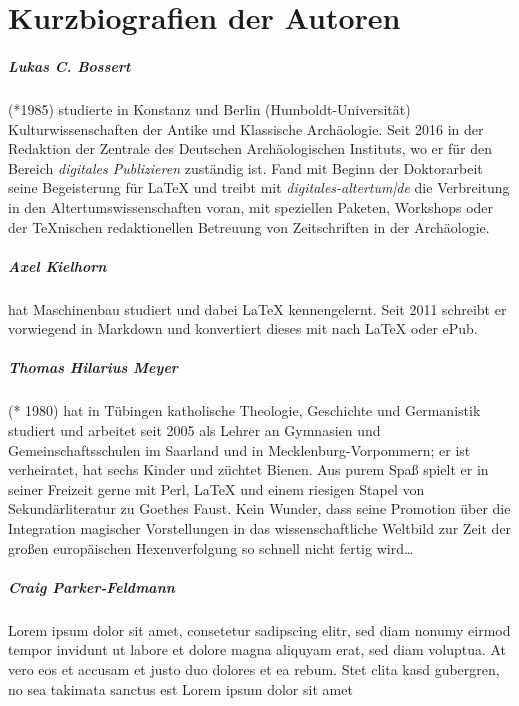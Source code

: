 \chapter{Kurzbiografien der Autoren}


\paragraph{Lukas C. Bossert} (*1985) studierte in Konstanz und Berlin (Humboldt-Universität) Kulturwissenschaften der Antike und Klassische Archäologie. Seit 2016 in der Redaktion der Zentrale des Deutschen Archäologischen Instituts,
wo er für den Bereich \emph{digitales Publizieren} zuständig ist.
Fand mit Beginn der Doktorarbeit seine Begeisterung für \LaTeX{} und treibt mit \emph{digitales-altertum|de} die Verbreitung in den  Altertumswissenschaften voran, mit speziellen Paketen, Workshops oder der \TeX nischen redaktionellen Betreuung von Zeitschriften in der Archäologie.

\paragraph{Axel Kielhorn} hat Maschinenbau studiert und dabei \LaTeX{} kennengelernt. 
Seit 2011 schreibt er vorwiegend in Markdown und konvertiert dieses mit  nach \LaTeX{} oder ePub.

\paragraph{Thomas Hilarius Meyer} (* 1980) hat in Tübingen katholische Theologie, Geschichte und Germanistik studiert und arbeitet
seit 2005 als Lehrer an Gymnasien und Gemeinschaftsschulen im Saarland und in Mecklenburg-Vorpommern;
er ist verheiratet, hat sechs Kinder und züchtet Bienen.
Aus purem Spaß spielt er in seiner Freizeit gerne mit Perl, \LaTeX{} und einem riesigen Stapel von Sekundärliteratur zu
Goethes Faust. Kein Wunder, dass seine Promotion über die Integration magischer Vorstellungen in das wissenschaftliche Weltbild
zur Zeit der großen europäischen Hexenverfolgung so schnell nicht fertig wird\ldots

\paragraph{Craig Parker-Feldmann} Lorem ipsum dolor sit amet, consetetur sadipscing elitr, sed diam nonumy eirmod tempor invidunt ut labore et dolore magna aliquyam erat, sed diam voluptua. At vero eos et accusam et justo duo dolores et ea rebum. Stet clita kasd gubergren, no sea takimata sanctus est Lorem ipsum dolor sit amet

